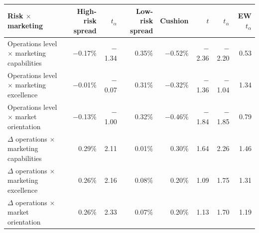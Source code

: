 \begin{tabular}{lrrrrrrr}
\toprule
Risk $\times$ marketing & High-risk spread & $t_\alpha$ & Low-risk spread & Cushion & $t$ & $t_\alpha$ & EW $t_\alpha$ \\
\midrule
Operations level $\times$ marketing capabilities & \ensuremath{-}0.17\% & \ensuremath{-}1.34 & 0.35\% & \ensuremath{-}0.52\% & \ensuremath{-}2.36 & \ensuremath{-}2.20 & 0.53 \\
Operations level $\times$ marketing excellence & \ensuremath{-}0.01\% & \ensuremath{-}0.07 & 0.31\% & \ensuremath{-}0.32\% & \ensuremath{-}1.36 & \ensuremath{-}1.04 & 1.34 \\
Operations level $\times$ market orientation & \ensuremath{-}0.13\% & \ensuremath{-}1.00 & 0.32\% & \ensuremath{-}0.46\% & \ensuremath{-}1.84 & \ensuremath{-}1.85 & 0.79 \\
$\Delta$ operations $\times$ marketing capabilities & 0.29\% & 2.11 & 0.01\% & 0.30\% & 1.64 & 2.26 & 1.46 \\
$\Delta$ operations $\times$ marketing excellence & 0.26\% & 2.16 & 0.08\% & 0.20\% & 1.09 & 1.75 & 1.31 \\
$\Delta$ operations $\times$ market orientation & 0.26\% & 2.33 & 0.07\% & 0.20\% & 1.13 & 1.70 & 1.19 \\
\bottomrule
\end{tabular}
